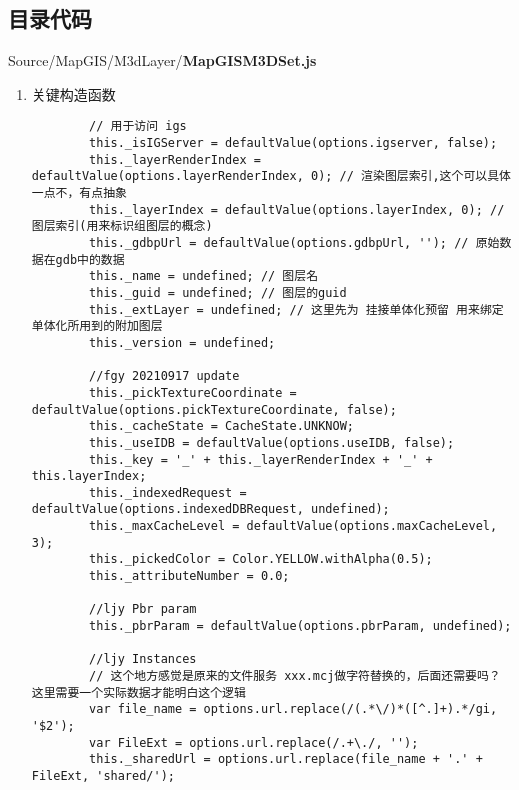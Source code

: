 \subsection{目录代码}
Source/MapGIS/M3dLayer/\textbf{MapGISM3DSet.js}
\begin{enumerate}
	\item 关键构造函数 
	\begin{lstlisting}
		// 用于访问 igs
		this._isIGServer = defaultValue(options.igserver, false);
		this._layerRenderIndex = defaultValue(options.layerRenderIndex, 0); // 渲染图层索引,这个可以具体一点不，有点抽象
		this._layerIndex = defaultValue(options.layerIndex, 0); // 图层索引(用来标识组图层的概念)
		this._gdbpUrl = defaultValue(options.gdbpUrl, ''); // 原始数据在gdb中的数据
		this._name = undefined; // 图层名
		this._guid = undefined; // 图层的guid
		this._extLayer = undefined; // 这里先为 挂接单体化预留 用来绑定单体化所用到的附加图层
		this._version = undefined;

		//fgy 20210917 update
		this._pickTextureCoordinate = defaultValue(options.pickTextureCoordinate, false);
		this._cacheState = CacheState.UNKNOW;
		this._useIDB = defaultValue(options.useIDB, false);
		this._key = '_' + this._layerRenderIndex + '_' + this.layerIndex;
		this._indexedRequest = defaultValue(options.indexedDBRequest, undefined);
		this._maxCacheLevel = defaultValue(options.maxCacheLevel, 3);
		this._pickedColor = Color.YELLOW.withAlpha(0.5);
		this._attributeNumber = 0.0;

		//ljy Pbr param
		this._pbrParam = defaultValue(options.pbrParam, undefined);

		//ljy Instances
		// 这个地方感觉是原来的文件服务 xxx.mcj做字符替换的，后面还需要吗？ 这里需要一个实际数据才能明白这个逻辑
		var file_name = options.url.replace(/(.*\/)*([^.]+).*/gi, '$2');
		var FileExt = options.url.replace(/.+\./, '');
		this._sharedUrl = options.url.replace(file_name + '.' + FileExt, 'shared/');
	\end{lstlisting}
\end{enumerate}